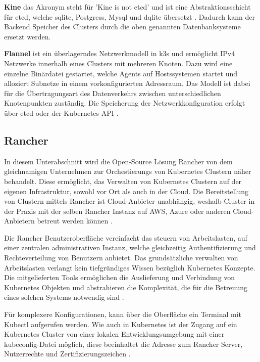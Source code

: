 \textbf{Kine}
das Akronym steht für 'Kine is not etcd' und ist eine Abstraktionsschicht für etcd, welche sqlite, Postgress, Mysql und dqlite übersetzt \cite{k3sgit}.
Dadurch kann der Backend Speicher des Clusters durch die oben genannten Datenbanksysteme ersetzt werden.

\textbf{Flannel}
ist ein überlagerndes Netzwerkmodell in k3s und ermöglicht IPv4 Netzwerke innerhalb eines Clusters mit mehreren Knoten.
Dazu wird eine einzelne Binärdatei gestartet, welche Agents auf Hostssystemen startet und alloziert Subnetze in einem vorkonfigurierten Adressraum.
Das Modell ist dabei für die Übertragungsart des Datenverkehrs zwischen unterschiedlichen Knotenpunkten zuständig.
Die Speicherung der Netzwerkkonfiguration erfolgt über etcd oder der Kubernetes API \cite{flannel}.


\subsection{Rancher}
In diesem Unterabschnitt wird die Open-Source Lösung Rancher von dem gleichnamigen Unternehmen zur Orchestierungs von Kubernetes Clustern näher behandelt.
Diese ermöglicht, das Verwalten von Kubernetes Clustern auf der eigenen Infrastruktur, sowohl vor Ort als auch in der Cloud.
Die Bereitstellung von Clustern mittels Rancher ist Cloud-Anbieter unabhängig,
weshalb Cluster in der Praxis mit der selben Rancher Instanz auf AWS, Azure oder anderen Cloud-Anbietern betreut werden können \cite{rancher}.

Die Rancher Benutzeroberfläche vereinfacht das steuern von Arbeitslasten, auf einer zentralen administrativen Instanz, welche gleichzeitig Authentifizierung und Rechteverteilung von Benutzern anbietet.
Das grundsätzliche verwalten von Arbeitslasten verlangt kein tiefgründiges Wissen bezüglich Kubernetes Konzepte. 
Die mitgelieferten Tools ermöglichen die Auslieferung und Verbindung von Kubernetes Objekten und abstrahieren die Komplexität, die für die Betreuung eines solchen Systems notwendig sind \cite{rancher,AzureKubernetesService}.

Für komplexere Konfigurationen, kann über die Oberfläche ein Terminal mit Kubectl aufgerufen werden.
Wie auch in Kubernetes ist der Zugang auf ein Kubernetes Cluster von einer lokalen Entwicklungsumgebung mit einer kubeconfig-Datei möglich, diese beeinhaltet die Adresse zum Rancher Server, Nutzerrechte und Zertifizierungszeichen \cite{rancherKubeconfig}.

